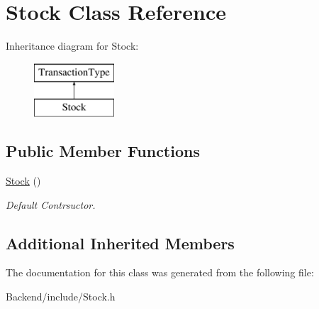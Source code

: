 \hypertarget{class_stock}{}\section{Stock Class Reference}
\label{class_stock}
Inheritance diagram for Stock\+:\begin{figure}[H]
\begin{center}
\leavevmode
\includegraphics[height=2.000000cm]{class_stock}
\end{center}
\end{figure}
\subsection*{Public Member Functions}
\begin{DoxyCompactItemize}
\item 
\mbox{\label{class_stock_adddc4282213b3174a4299cca5a30117c}} 
\mbox{\hyperlink{class_stock_adddc4282213b3174a4299cca5a30117c}{Stock}} ()
\begin{DoxyCompactList}\small\item\em Default Contrsuctor. \end{DoxyCompactList}\end{DoxyCompactItemize}
\subsection*{Additional Inherited Members}


The documentation for this class was generated from the following file\+:\begin{DoxyCompactItemize}
\item 
Backend/include/Stock.\+h\end{DoxyCompactItemize}
